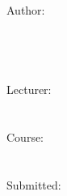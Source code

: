 \begin{titlepage}
~\\
~\\
~\\
~\\
\begin{figure}
\hfill
{}
\end{figure}
\begin{center}
~\\
~\\
~\\
~\\
~\\
~\\
\Huge\documentTitle\normalsize\\
~\\
\Large\documentSubTitle\normalsize\\
~\\
~\\
~\\
~\\
~\\
~\\
Author:\\
\documentAuthor\\
\documentAuthorStreet\\
\documentAuthorPostalcode \documentAuthorCity\\
~\\
Lecturer:\\
\documentUniProf\\
~\\
Course:\\
\documentUniCourse\\
~\\
Submitted:\\
\documentDate\\
\end{center}
\end{titlepage}
